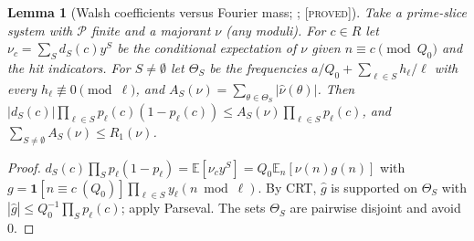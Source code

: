 \documentclass[10pt,reqno]{amsart}
\newtheorem{lemma}[theorem]{Lemma}
\theoremstyle{definition}
\theoremstyle{remark}
\newcommand{\cP}{\mathcal P}
\newcommand{\E}{\mathbb E}
\newcommand{\ind}{\mathbf 1}
\newcommand{\lab}[1]{\textup{[\textsc{#1}]}}
\begin{document}
\begin{lemma}[Walsh coefficients versus Fourier mass; {\cite[Lemma~2.2]{NC}}; \lab{proved}]\label{lem:walshfourier}
Take a prime-slice system with $\cP$ finite and a majorant $\nu$ (any
moduli).  For $c\in R$ let $\nu_c=\sum_Sd_S(c)y^S$ be the conditional
expectation of $\nu$ given $n\equiv c\pmod{Q_0}$ and the hit indicators.  For
$S\neq\emptyset$ let $\Theta_S$ be the frequencies
$a/Q_0+\sum_{\ell\in S}h_\ell/\ell$ with every $h_\ell\not\equiv0\pmod\ell$, and
$A_S(\nu)=\sum_{\theta\in\Theta_S}|\hat\nu(\theta)|$.  Then
$|d_S(c)|\prod_{\ell\in S}p_\ell(c)(1-p_\ell(c))\leq A_S(\nu)\prod_{\ell\in S}p_\ell(c)$,
and $\sum_{S\neq\emptyset}A_S(\nu)\leq R_1(\nu)$.
\end{lemma}
\begin{proof}
$d_S(c)\prod_Sp_\ell(1-p_\ell)=\E[\nu_cy^S]=Q_0\E_n[\nu(n)g(n)]$ with
$g=\ind[n\equiv c\ (Q_0)]\prod_{\ell\in S}y_\ell(n\bmod\ell)$.  By CRT, $\hat g$ is
supported on $\Theta_S$ with $|\hat g|\leq Q_0^{-1}\prod_Sp_\ell(c)$; apply
Parseval.  The sets $\Theta_S$ are pairwise disjoint and avoid $0$.
\end{proof}
\end{document}
